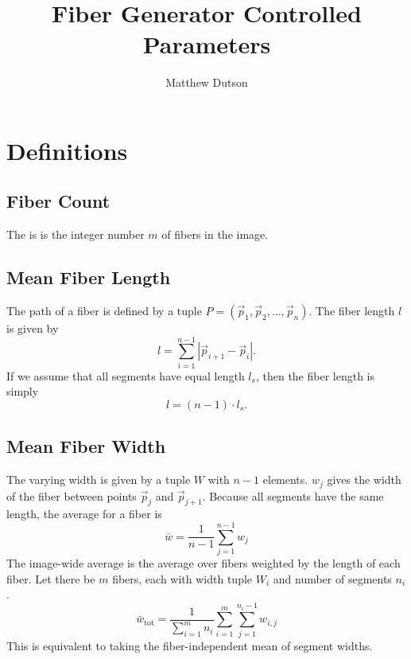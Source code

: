 \documentclass[12pt]{article}
\title{Fiber Generator Controlled Parameters}
\author{Matthew Dutson}
\begin{document}
\maketitle
\thispagestyle{empty}
\pagestyle{empty}

    
\section*{Definitions}


\subsection*{Fiber Count}

The is is the integer number $m$ of fibers in the image.


\subsection*{Mean Fiber Length}

The path of a fiber is defined by a tuple $P = (\vec{p}_1, \vec{p}_2, \ldots, \vec{p}_n)$. The fiber length $l$ is given by
\begin{equation*}
    l = \sum_{i = 1}^{n - 1} |\vec{p}_{i + 1} - \vec{p}_i|.
\end{equation*}
If we assume that all segments have equal length $l_s$, then the fiber length is simply
\begin{equation*}
    l = (n - 1) \cdot l_s.
\end{equation*}


\subsection*{Mean Fiber Width}

The varying width is given by a tuple $W$ with $n - 1$ elements. $w_j$ gives the width of the fiber between points $\vec{p}_j$ and $\vec{p}_{j + 1}$. Because all segments have the same length, the average for a fiber is
\begin{equation*}
    \bar{w} = \frac{1}{n - 1} \sum_{j = 1}^{n - 1} w_j
\end{equation*}
The image-wide average is the average over fibers weighted by the length of each fiber. Let there be $m$ fibers, each with width tuple $W_i$ and number of segments $n_i$.
\begin{equation*}
    \bar{w}_\text{tot} = 
        \frac{1}{\sum_{i = 1}^m n_i} 
        \sum_{i = 1}^m \sum_{j = 1}^{n_i - 1} w_{i,j}
\end{equation*}
This is equivalent to taking the fiber-independent mean of segment widths.
\end{document}
